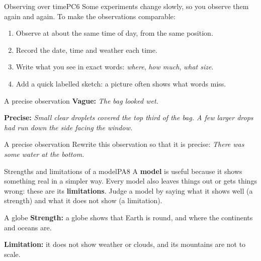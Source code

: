 
\begin{technique}{Observing over time}{PC6}
Some experiments change slowly, so you observe them again and again. To make the observations comparable:
\begin{enumerate}[leftmargin=1.6em, itemsep=1pt, topsep=3pt]
  \item Observe at about the same time of day, from the same position.
  \item Record the date, time and weather each time.
  \item Write what you see in exact words: \emph{where}, \emph{how much}, \emph{what size}.
  \item Add a quick labelled sketch: a picture often shows what words miss.
\end{enumerate}
\end{technique}

\begin{workedex}{A precise observation}
\textbf{Vague:} \emph{The bag looked wet.}

\smallskip
\textbf{Precise:} \emph{Small clear droplets covered the top third of the bag. A few larger drops had run down the side facing the window.}
\end{workedex}

\begin{wedo}{A precise observation}
Rewrite this observation so that it is precise: \emph{There was some water at the bottom.}
\answerbox{3.5cm}
\end{wedo}

\begin{technique}{Strengths and limitations of a model}{PA8}
A \textbf{model} is useful because it shows something real in a simpler way. Every model also leaves things out or gets things wrong: these are its \textbf{limitations}. Judge a model by saying what it shows well (a strength) and what it does not show (a limitation).
\end{technique}

\begin{workedex}{A globe}
\textbf{Strength:} a globe shows that Earth is round, and where the continents and oceans are.

\smallskip
\textbf{Limitation:} it does not show weather or clouds, and its mountains are not to scale.
\end{workedex}

